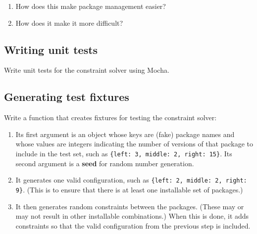 \documentclass[krantzl]{krantz}
\newcommand{\glossref}[1]{\textbf{#1}}
\begin{document}
\begin{enumerate}

\item 

How does this make package management easier?



\item 

How does it make it more difficult?



\end{enumerate}

\subsection*{Writing unit tests}


Write unit tests for the constraint solver using Mocha.

\subsection*{Generating test fixtures}


Write a function that creates fixtures for testing the constraint solver:

\begin{enumerate}

\item 

Its first argument is an object whose keys are (fake) package names
    and whose values are integers indicating the number of versions of that package
    to include in the test set,
    such as \texttt{\{{\textquotesingle}left{\textquotesingle}: 3, {\textquotesingle}middle{\textquotesingle}: 2, {\textquotesingle}right{\textquotesingle}: 15\}}.
    Its second argument is a \glossref{seed} for random number generation.



\item 

It generates one valid configuration,
    such as \texttt{\{{\textquotesingle}left{\textquotesingle}: 2, {\textquotesingle}middle{\textquotesingle}: 2, {\textquotesingle}right{\textquotesingle}: 9\}}.
    (This is to ensure that there is at least one installable set of packages.)



\item 

It then generates random constraints between the packages.
    (These may or may not result in other installable combinations.)
    When this is done,
    it adds constraints so that the valid configuration from the previous step is included.



\end{enumerate}
\end{document}

